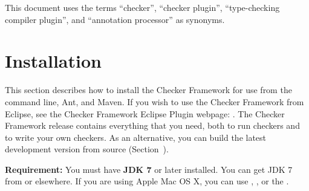 





This document uses the terms ``checker'', ``checker plugin'',
``type-checking compiler plugin'', and ``annotation processor'' as
synonyms.

\section{Installation\label{installation}}

This section describes how to install the Checker
Framework for use from the command line, Ant, and Maven.  If you wish to
use the Checker Framework from Eclipse, see the Checker Framework Eclipse
Plugin webpage: .
The Checker Framework release contains everything that you need, both to
run checkers and to write your own checkers.  As an alternative, you can
build the latest development version from source
(Section~).

\textbf{Requirement:}
You must have \textbf{JDK 7} or later installed.  You can get JDK 7 from
or elsewhere.  If you are using Apple Mac OS X, you can use
,
,
or the .

